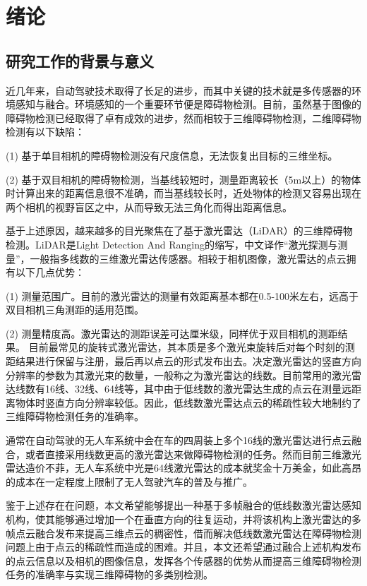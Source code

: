 
\chapter{绪论}
\section{研究工作的背景与意义}
近几年来，自动驾驶技术取得了长足的进步，而其中关键的技术就是多传感器的环境感知与融合。环境感知的一个重要环节便是障碍物检测。目前，虽然基于图像的障碍物检测已经取得了卓有成效的进步，然而相较于三维障碍物检测，二维障碍物检测有以下缺陷：

(1) 基于单目相机的障碍物检测没有尺度信息，无法恢复出目标的三维坐标。

(2) 基于双目相机的障碍物检测，当基线较短时，测量距离较长（5m以上）的物体时计算出来的距离信息很不准确，而当基线较长时，近处物体的检测又容易出现在两个相机的视野盲区之中，从而导致无法三角化而得出距离信息。

基于上述原因，越来越多的目光聚焦在了基于激光雷达（LiDAR）的三维障碍物检测。LiDAR是Light Detection And Ranging的缩写，中文译作“激光探测与测量”，一般指多线数的三维激光雷达传感器。相较于相机图像，激光雷达的点云拥有以下几点优势：

(1) 测量范围广。目前的激光雷达的测量有效距离基本都在0.5-100米左右，远高于双目相机三角测距的适用范围。

(2) 测量精度高。激光雷达的测距误差可达厘米级，同样优于双目相机的测距结果。
目前最常见的旋转式激光雷达，其本质是多个激光束旋转后对每个时刻的测距结果进行保留与注册，最后再以点云的形式发布出去。决定激光雷达的竖直方向分辨率的参数为其激光束的数量，一般称之为激光雷达的线数。目前常用的激光雷达线数有16线、32线、64线等，其中由于低线数的激光雷达生成的点云在测量远距离物体时竖直方向分辨率较低。因此，低线数激光雷达点云的稀疏性较大地制约了三维障碍物检测任务的准确率。

通常在自动驾驶的无人车系统中会在车的四周装上多个16线的激光雷达进行点云融合，或者直接采用线数更高的激光雷达来做障碍物检测的任务。然而目前三维激光雷达造价不菲，无人车系统中光是64线激光雷达的成本就奖金十万美金，如此高昂的成本在一定程度上限制了无人驾驶汽车的普及与推广。

鉴于上述存在在问题，本文希望能够提出一种基于多帧融合的低线数激光雷达感知机构，使其能够通过增加一个在垂直方向的往复运动，并将该机构上激光雷达的多帧点云融合发布来提高三维点云的稠密性，借而解决低线数激光雷达在障碍物检测问题上由于点云的稀疏性而造成的困难。并且，本文还希望通过融合上述机构发布的点云信息以及相机的图像信息，发挥各个传感器的优势从而提高三维障碍物检测任务的准确率与实现三维障碍物的多类别检测。

